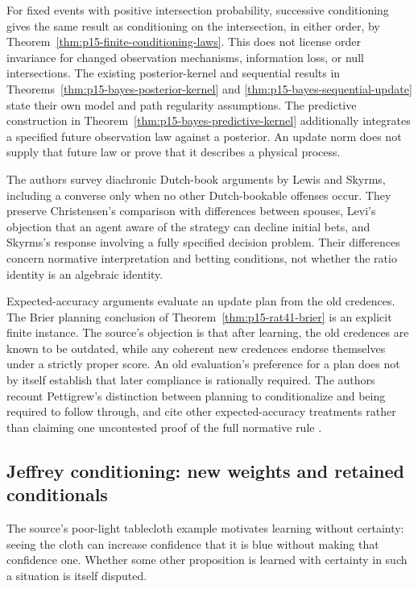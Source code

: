 For fixed events with positive intersection probability, successive
conditioning gives the same result as conditioning on the intersection,
in either order, by Theorem~\ref{thm:p15-finite-conditioning-laws}.
This does not license order invariance for changed observation mechanisms,
information loss, or null intersections. The existing posterior-kernel
and sequential results in
Theorems~\ref{thm:p15-bayes-posterior-kernel} and
\ref{thm:p15-bayes-sequential-update} state their own model and path
regularity assumptions. The predictive construction in
Theorem~\ref{thm:p15-bayes-predictive-kernel} additionally integrates a
specified future observation law against a posterior. An update norm
does not supply that future law or prove that it describes a physical
process.

The authors survey diachronic Dutch-book arguments by Lewis and Skyrms,
including a converse only when no other Dutch-bookable offenses occur.
They preserve Christensen's comparison with differences between spouses,
Levi's objection that an agent aware of the strategy can decline initial
bets, and Skyrms's response involving a fully specified decision problem.
Their differences concern normative interpretation and betting
conditions, not whether the ratio identity is an algebraic identity.

Expected-accuracy arguments evaluate an update plan from the old
credences. The Brier planning conclusion of
Theorem~\ref{thm:p15-rat41-brier} is an explicit finite instance. The
source's objection is that after learning, the old credences are known
to be outdated, while any coherent new credences endorse themselves
under a strictly proper score. An old evaluation's preference for a plan
does not by itself establish that later compliance is rationally required.
The authors recount Pettigrew's distinction between planning to
conditionalize and being required to follow through, and cite other
expected-accuracy treatments rather than claiming one uncontested proof
of the full normative rule
\parencite[p.~244]{HajekStaffel2021Dynamics}.

\subsection{Jeffrey conditioning: new weights and retained conditionals}

The source's poor-light tablecloth example motivates learning without
certainty: seeing the cloth can increase confidence that it is blue
without making that confidence one. Whether some other proposition is
learned with certainty in such a situation is itself disputed.

